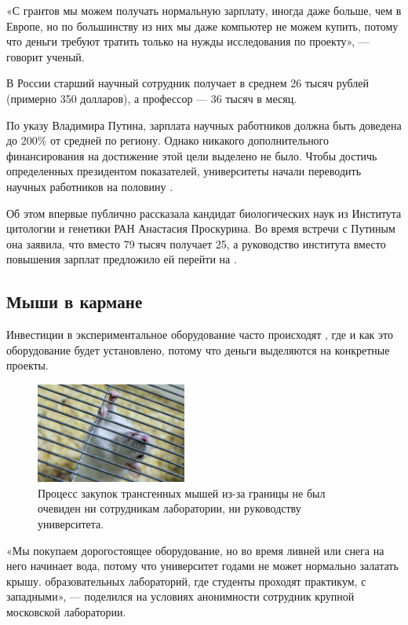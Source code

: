«С грантов мы можем получать нормальную зарплату, иногда даже больше, чем в Европе, но по большинству из них мы даже компьютер не можем купить, потому что деньги требуют тратить только на  нужды исследования по проекту», --- говорит ученый.

В России старший научный сотрудник получает в среднем 26 тысяч рублей (примерно 350 долларов), а профессор --- 36 тысяч в месяц.

По указу Владимира Путина, зарплата научных работников должна быть доведена до 200\% от средней по региону. Однако никакого дополнительного финансирования на достижение этой цели выделено не было. Чтобы достичь определенных президентом показателей, университеты начали переводить научных работников на половину .

Об этом впервые публично рассказала кандидат биологических наук из Института цитологии и генетики РАН Анастасия Проскурина. Во время встречи с Путиным она заявила, что вместо  79 тысяч получает 25, а руководство института вместо повышения зарплат предложило ей перейти на .


\subsection{Мыши в кармане}

Инвестиции в экспериментальное оборудование часто происходят , где и как это оборудование будет установлено, потому что деньги выделяются на конкретные проекты.

\begin{figure}
    \begin{center}
        \includegraphics[width=0.44\textwidth]{img/mouse.png}
    \end{center}
    \caption{Процесс закупок трансгенных мышей из-за границы не был очевиден ни сотрудникам лаборатории, ни руководству университета.}
\end{figure}
«Мы покупаем  дорогостоящее оборудование, но во время ливней или  снега на него начинает  вода, потому что университет годами не может нормально залатать крышу.  образовательных лабораторий, где студенты проходят практикум,  с западными», --- поделился на условиях анонимности сотрудник крупной московской лаборатории.

